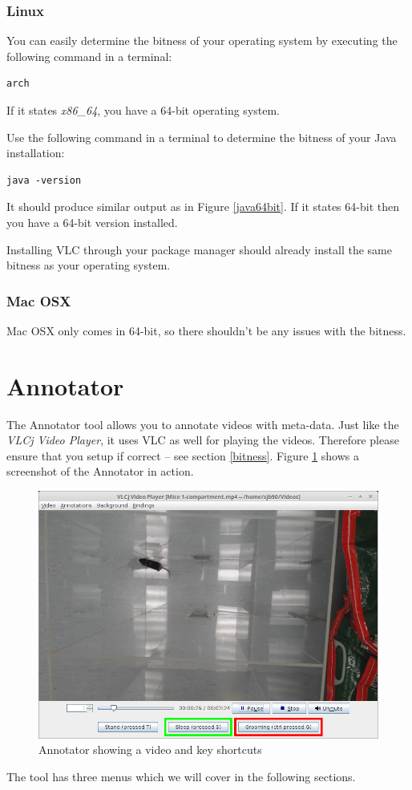 \documentclass[a4paper]{book}
\begin{document}
\subsubsection{Linux}
You can easily determine the bitness of your operating system by executing
the following command in a terminal:
\begin{verbatim}
arch
\end{verbatim}
If it states \textit{x86\_64}, you have a 64-bit operating system.

Use the following command in a terminal to determine the bitness of your
Java installation:
\begin{verbatim}
java -version
\end{verbatim}
It should produce similar output as in Figure \ref{java64bit}. If it states
64-bit then you have a 64-bit version installed.

Installing VLC through your package manager should already install the same
bitness as your operating system.

\subsubsection{Mac OSX}
Mac OSX only comes in 64-bit, so there shouldn't be any issues with the bitness.

\clearpage
\newpage
\section{Annotator}

The Annotator tool allows you to annotate videos with meta-data. Just like
the \textit{VLCj Video Player}, it uses VLC as well for playing the videos.
Therefore please ensure that you setup if correct -- see section \ref{bitness}.
Figure \ref{annotator_in_use} shows a screenshot of the Annotator in action.
\begin{figure}[htb]
  \centering
  \includegraphics[width= 12.0cm]{images/AnnotatorInUse.png}
  \caption{Annotator showing a video and key shortcuts}
  \label{annotator_in_use}
\end{figure}
The tool has three menus which we will cover in the following sections.
\end{document}
